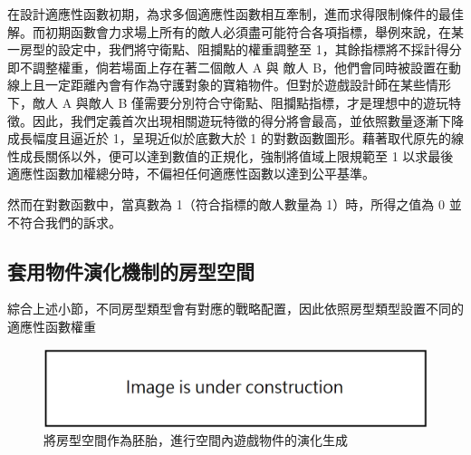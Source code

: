 在設計適應性函數初期，為求多個適應性函數相互牽制，進而求得限制條件的最佳解。而初期函數會力求場上所有的敵人必須盡可能符合各項指標，舉例來說，在某一房型的設定中，我們將守衛點、阻攔點的權重調整至 1，其餘指標將不採計得分即不調整權重，倘若場面上存在著二個敵人 A 與 敵人 B，他們會同時被設置在動線上且一定距離內會有作為守護對象的寶箱物件。但對於遊戲設計師在某些情形下，敵人 A 與敵人 B 僅需要分別符合守衛點、阻攔點指標，才是理想中的遊玩特徵。因此，我們定義首次出現相關遊玩特徵的得分將會最高，並依照數量逐漸下降成長幅度且逼近於 1，呈現近似於底數大於 1 的對數函數圖形。藉著取代原先的線性成長關係以外，便可以達到數值的正規化，強制將值域上限規範至 1 以求最後適應性函數加權總分時，不偏袒任何適應性函數以達到公平基準。

然而在對數函數中，當真數為 1（符合指標的敵人數量為 1）時，所得之值為 0 並不符合我們的訴求。

\subsection{套用物件演化機制的房型空間}
\label{ssec:method-segments-appliedonvolumes}

綜合上述小節，不同房型類型會有對應的戰略配置，因此依照房型類型設置不同的適應性函數權重

\begin{figure}[h]
  \begin{center}
    \includegraphics[width=1.0\textwidth]{figures/under_construction.png}
    \caption{將房型空間作為胚胎，進行空間內遊戲物件的演化生成} 
    \label{fig:applied-ga-on-volume}
  \end{center}
\end{figure}











